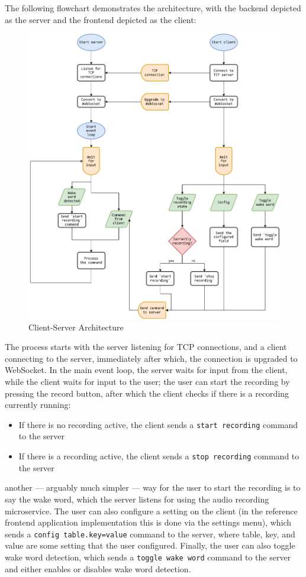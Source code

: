 The following flowchart demonstrates the architecture, with the backend depicted as the server and the frontend depicted as the client:
\begin{figure}[H]
\centering
\includegraphics[width=\textwidth]{assets/architecture}
\caption{Client-Server Architecture}
\label{chart:architecture}
\end{figure}

The process starts with the server listening for TCP connections, and a client connecting to the server, immediately after which,
the connection is upgraded to WebSocket.
In the main event loop, the server waits for input from the client, while the client waits for input to the user;
the user can start the recording by pressing the record button, after which the client checks if there is a recording currently running:

\begin{itemize}
    \item If there is no recording active, the client sends a \texttt{start recording} command to the server
    \item If there is a recording active, the client sends a \texttt{stop recording} command to the server
\end{itemize}

another --- arguably much simpler --- way for the user to start the recording is to say the wake word, which the server listens for
using the audio recording microservice.
The user can also configure a setting on the client (in the reference frontend application implementation this is done via the settings menu),
which sends a \texttt{config table.key=value} command to the server, where table, key, and value are some setting that the user configured.
Finally, the user can also toggle wake word detection, which sends a \texttt{toggle wake word} command to the server and either enables or disables
wake word detection.
